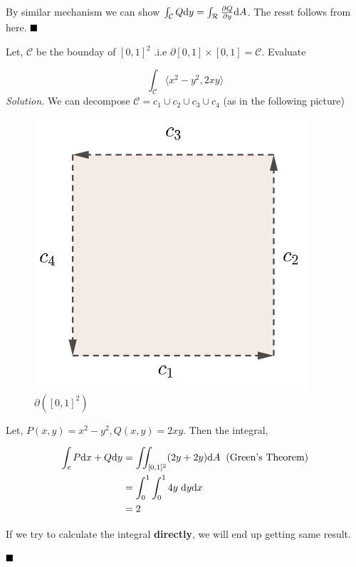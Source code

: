 \documentclass[Analysis-3]{subfiles}
\begin{document}
 By similar mechanism we can show $\int_{\mathcal{C}} Q \dd y = \int_{\mathcal{R}} \pdv{Q}{y} \dd A$. The resst follows from here. $\hfill \blacksquare$
\pagebreak
\begin{Eg}{}{}
    Let, $\mathcal{C}$ be the bounday of $[0,1]^2$ .i.e $\partial [0,1]\times[0,1] = \mathcal{C}$. Evaluate

    \[\int_{\mathcal{C}} \langle x^2-y^2,2xy \rangle\]
    \textit{Solution.} We can decompose $\mathcal{C} = c_1 \cup c_2 \cup c_3 \cup c_4$ (as in the following picture)

    \begin{figure}
        \centering
        \includegraphics[width=.78\linewidth]{figures/lec-28.2.png}
        \caption{$\partial( [0,1]^2)$}
    \end{figure}
    
    Let, $P(x,y) = x^2 - y^2, Q(x,y) = 2xy$. Then the integral, 
    
    \begin{align*}
        \int_c P \dd x + Q \dd y &= \iint_{[0,1]^2} (2y + 2y) \dd A \hspace{0.2cm} \text{(Green's Theorem)}\\
        &= \int_{0}^1 \int_0^1 4y \hspace{0.1cm} \dd y \dd x \\
        &= 2
    \end{align*}
    
    If we try to calculate the integral \textbf{directly}, we will end up getting same result.
    
    $\hfill \blacksquare$
\end{Eg}
\end{document}
